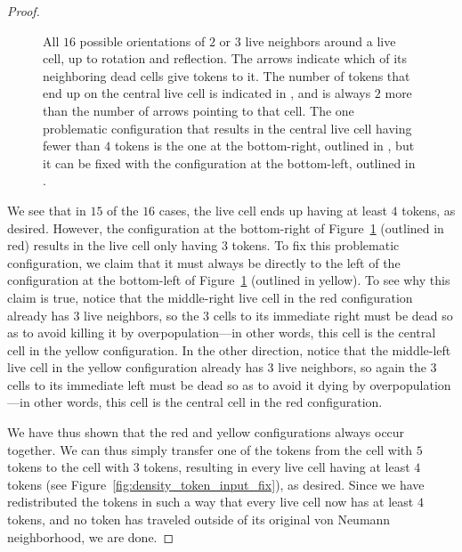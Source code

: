 \begin{proof}
\begin{figure}[!htb]
		\caption{All $16$ possible orientations of $2$ or $3$ live neighbors around a live cell, up to rotation and reflection. The  arrows indicate which of its neighboring dead cells give tokens to it. The number of tokens that end up on the central live cell is indicated in , and is always $2$ more than the number of arrows pointing to that cell. The one problematic configuration that results in the central live cell having fewer than $4$ tokens is the one at the bottom-right, outlined in , but it can be fixed with the configuration at the bottom-left, outlined in .}\label{fig:density_token_input}
	\end{figure}
	
	We see that in $15$ of the $16$ cases, the live cell ends up having at least $4$ tokens, as desired. However, the configuration at the bottom-right of Figure~\ref{fig:density_token_input} (outlined in red) results in the live cell only having $3$ tokens. To fix this problematic configuration, we claim that it must always be directly to the left of the configuration at the bottom-left of Figure~\ref{fig:density_token_input} (outlined in yellow). To see why this claim is true, notice that the middle-right live cell in the red configuration already has $3$ live neighbors, so the $3$ cells to its immediate right must be dead so as to avoid killing it by overpopulation---in other words, this cell is the central cell in the yellow configuration. In the other direction, notice that the middle-left live cell in the yellow configuration already has $3$ live neighbors, so again the $3$ cells to its immediate left must be dead so as to avoid it dying by overpopulation---in other words, this cell is the central cell in the red configuration.
	
	We have thus shown that the red and yellow configurations always occur together. We can thus simply transfer one of the tokens from the cell with $5$ tokens to the cell with $3$ tokens, resulting in every live cell having at least $4$ tokens (see Figure~\ref{fig:density_token_input_fix}), as desired. Since we have redistributed the tokens in such a way that every live cell now has at least $4$ tokens, and no token has traveled outside of its original von Neumann neighborhood, we are done.
\end{proof}

